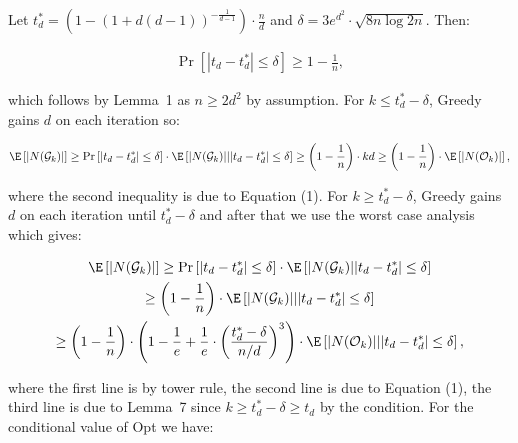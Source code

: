 Let $t^{*}_{d}=\left(1-\left(1+d(d-1)\right)^{-\frac{1}{d-1}}\right)\cdot\frac{n}{d}$ and $\delta=3e^{d^{2}}\cdot\sqrt{8n\log{2n}}$.
Then:\par


\[\begin{gathered}
\displaystyle\Pr\left[|t_{d}-t^{*}_{d}|\leq\delta\right]\geq 1-\frac{1}{n},
\end{gathered}\]


which follows by Lemma 1 as $n\geq 2d^{2}$ by assumption.
For $k\leq t^{*}_{d}-\delta$, Greedy gains $d$ on each iteration so:\par


\[\begin{gathered}
\displaystyle\E\left[|N(\mathcal{G}_{k})|\right]\geq\Pr\left[|t_{d}-t^{*}_{d}|\leq\delta\right]\cdot\E\left[|N(\mathcal{G}_{k})|\middle||t_{d}-t^{*}_{d}|\leq\delta\right]\geq\left(1-\frac{1}{n}\right)\cdot kd\geq\left(1-\frac{1}{n}\right)\cdot\E\left[|N(\mathcal{O}_{k})|\right],
\end{gathered}\]


where the second inequality is due to Equation (1).
For $k\geq t^{*}_{d}-\delta$, Greedy gains $d$ on each iteration until $t^{*}_{d}-\delta$ and after that we use the worst case analysis which gives:\par


\[\begin{gathered}
\displaystyle\E\left[|N(\mathcal{G}_{k})|\right] \displaystyle\geq\Pr\left[|t_{d}-t^{*}_{d}|\leq\delta\right]\cdot\E\left[|N(\mathcal{G}_{k})\middle||t_{d}-t^{*}_{d}|\leq\delta\right] \\
\displaystyle\geq\left(1-\frac{1}{n}\right)\cdot\E\left[|N(\mathcal{G}_{k})|\middle||t_{d}-t^{*}_{d}|\leq\delta\right] \\
\displaystyle\geq\left(1-\frac{1}{n}\right)\cdot\left(1-\frac{1}{e}+\frac{1}{e}\cdot\left(\frac{t^{*}_{d}-\delta}{n/d}\right)^{3}\right)\cdot\E\left[|N(\mathcal{O}_{k})|\middle||t_{d}-t^{*}_{d}|\leq\delta\right],
\end{gathered}\]


where the first line is by tower rule, the second line is due to Equation (1), the third line is due to Lemma 7 since $k\geq t^{*}_{d}-\delta\geq t_{d}$ by the condition.
For the conditional value of Opt we have:\par


